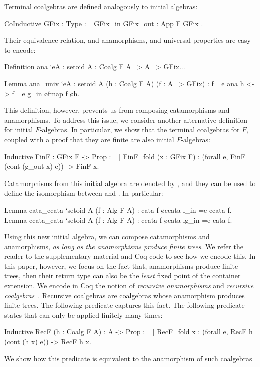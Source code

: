 \documentclass[anonymous, a4paper, UKenglish, cleveref, autoref, thm-restate]{lipics-v2021}
\begin{document}
Terminal coalgebras are defined analogously to initial algebras:
\begin{coqcode}
CoInductive GFix : Type := GFix_in { GFix_out : App F GFix }.
\end{coqcode}
Their equivalence relation, and anamorphisms, and universal properties are
easy to encode:
\begin{coqcode}
  Definition ana `{eA : setoid A} : Coalg F A ~> A ~> GFix...

  Lemma ana_univ `{eA : setoid A} (h : Coalg F A) (f : A ~> GFix)
    : f =e ana h <-> f =e g_in \o fmap f \o h.
\end{coqcode}
This definition, however, prevents us from composing catamorphisms and
anamorphisms. To address this issue, we consider another alternative definition
for initial $F$-algebras. In particular, we show that the terminal coalgebras
for $F$, coupled with a proof that they are finite are also initial
$F$-algebras:
\begin{coqcode}
Inductive FinF : GFix F -> Prop :=
| FinF_fold (x : GFix F) : (forall e, FinF (cont (g_out x) e)) -> FinF x.
\end{coqcode}
Catamorphisms from this initial algebra are denoted by ,
and they can be used to define the isomorphism between 
 and
. In particular: 
\begin{coqcode}
Lemma cata_ccata `{setoid A} (f : Alg F A) : cata f \o ccata l_in =e ccata f.
Lemma ccata_cata `{setoid A} (f : Alg F A) : ccata f \o cata lg_in =e cata f.
\end{coqcode}
Using this new initial algebra, we can compose catamorphisms and anamorphisms,
\emph{as long as the anamorphisms produce finite trees}. We refer the reader to
the supplementary material and Coq code to see how we encode this. In this
paper, however, we focus on the fact that, anamorphisms produce finite trees,
then their return type can also be the \emph{least} fixed point of the
container extension. We encode in Coq the notion of \emph{recursive
anamorphisms} and \emph{recursive coalgebras}~\cite{TODO}.  Recursive
coalgebras are coalgebras whose anamorphism produces finite trees.  The
following predicate captures this fact. The following predicate states that
 can only be applied finitely many times:
\begin{coqcode}
Inductive RecF (h : Coalg F A) : A -> Prop :=
| RecF_fold x : (forall e, RecF h (cont (h x) e)) -> RecF h x.
\end{coqcode}
We show how this predicate is equivalent to the anamorphism of such coalgebras
\end{document}
